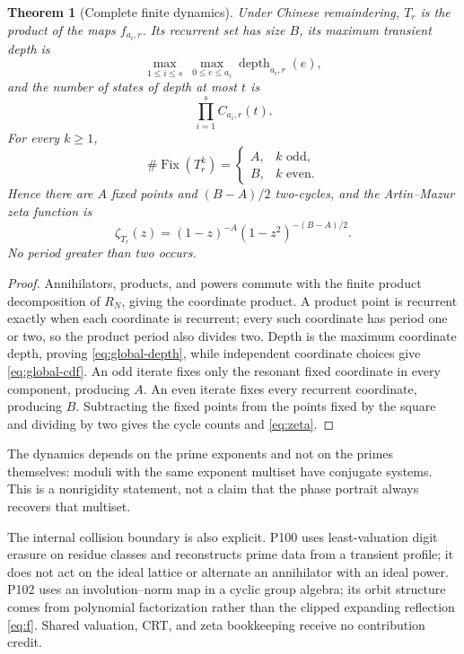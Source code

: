 \documentclass[11pt,a4paper]{amsart}
\newcommand{\Fix}{\operatorname{Fix}}
\newcommand{\depth}{\operatorname{depth}}
\newtheorem{theorem}{Theorem}[section]
\begin{document}
\begin{theorem}[Complete finite dynamics]
\label{thm:global}
Under Chinese remaindering, $T_r$ is the product of the maps
$f_{a_i,r}$.  Its recurrent set has size $B$, its maximum transient depth is
\begin{equation}
 \label{eq:global-depth}
 \max_{1\leq i\leq s}\ \max_{0\leq e\leq a_i}\depth_{a_i,r}(e),
\end{equation}
and the number of states of depth at most $t$ is
\begin{equation}
 \label{eq:global-cdf}
 \prod_{i=1}^{s}C_{a_i,r}(t).
\end{equation}
For every $k\geq1$,
\begin{equation}
 \label{eq:fixed-global}
 \#\Fix(T_r^k)=
 \begin{cases}
  A,&k\text{ odd},\\
  B,&k\text{ even}.
 \end{cases}
\end{equation}
Hence there are $A$ fixed points and $(B-A)/2$ two-cycles, and the
Artin--Mazur zeta function \citep{ArtinMazur1965} is
\begin{equation}
 \label{eq:zeta}
 \zeta_{T_r}(z)=(1-z)^{-A}(1-z^2)^{-(B-A)/2}.
\end{equation}
No period greater than two occurs.
\end{theorem}

\begin{proof}
Annihilators, products, and powers commute with the finite product
decomposition of $R_N$, giving the coordinate product.  A product point is
recurrent exactly when each coordinate is recurrent; every such coordinate
has period one or two, so the product period also divides two.  Depth is the
maximum coordinate depth, proving \eqref{eq:global-depth}, while independent
coordinate choices give \eqref{eq:global-cdf}.  An odd iterate fixes only
the resonant fixed coordinate in every component, producing $A$.  An even
iterate fixes every recurrent coordinate, producing $B$.  Subtracting the
fixed points from the points fixed by the square and dividing by two gives
the cycle counts and \eqref{eq:zeta}.
\end{proof}

The dynamics depends on the prime exponents and not on the primes themselves:
moduli with the same exponent multiset have conjugate systems.  This is a
nonrigidity statement, not a claim that the phase portrait always recovers
that multiset.

The internal collision boundary is also explicit.  P100 uses least-valuation
digit erasure on residue classes and reconstructs prime data from a transient
profile; it does not act on the ideal lattice or alternate an annihilator with
an ideal power.  P102 uses an involution--norm map in a cyclic group algebra;
its orbit structure comes from polynomial factorization rather than the
clipped expanding reflection \eqref{eq:f}.  Shared valuation, CRT, and zeta
bookkeeping receive no contribution credit.
\end{document}
